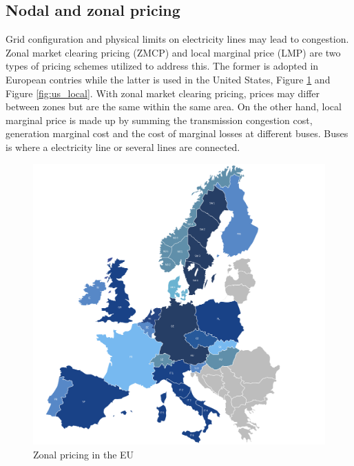 \subsection{Nodal and zonal pricing}
Grid configuration and physical limits on electricity lines may lead to congestion. Zonal market clearing pricing (ZMCP) and local marginal price (LMP) are two types of pricing schemes utilized to address this. The former is adopted in European contries while the latter is used in the United States, Figure \ref{fig:eu_zonal} and Figure \ref{fig:us_local}.
With zonal market clearing pricing, prices may differ between zones but are the same within the same area.
On the other hand, local marginal price is made up by summing the transmission congestion cost, generation marginal cost and the cost of marginal losses at different buses. Buses is where a electricity line or several lines are connected.
\begin{figure}[!h]
    \includegraphics[width=\textwidth]{images/eu_zonal.png}
    \caption[Zonal pricing in the EU]{Zonal pricing in the EU }
    \label{fig:eu_zonal}
\end{figure}


